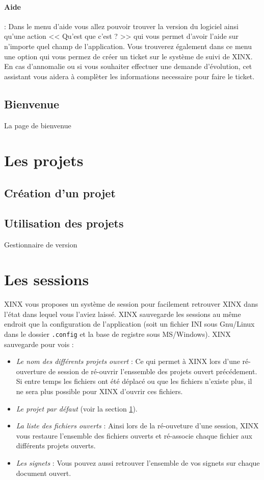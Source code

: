 \documentclass[a4paper,10pt,twoside]{book}
\begin{document}
\paragraph{Aide} : Dans le menu d'aide vous allez pouvoir trouver la version du logiciel ainsi qu'une action << Qu'est que c'est ? >> qui vous permet d'avoir l'aide sur n'importe quel champ de l'application. Vous trouverez également dans ce menu une option qui vous permez de créer un ticket sur le système de suivi de XINX. En cas d'annomalie ou si vous souhaiter effectuer une demande d'évolution, cet assistant vous aidera à complèter les informations necessaire pour faire le ticket.


\subsection{Bienvenue}
\label{sub:bienvenue}

La page de bienvenue

\section{Les projets}
\label{sec:Projets}

\subsection{Création d'un projet}

\subsection{Utilisation des projets}
\label{sec:RCS}
Gestionnaire de version

\section{Les sessions}
\label{sec:Sessions}

XINX vous proposes un système de session pour facilement retrouver XINX dans l'état dans lequel vous l'aviez laissé. XINX sauvegarde les sessions au même endroit que la configuration de l'application (soit un fichier INI sous Gnu/Linux dans le dossier \verb+.config+ et la base de registre sous MS/Windows). XINX sauvegarde pour vois :
\begin{itemize}
 \item \emph{Le nom des différents projets ouvert} : Ce qui permet à XINX lors d'une ré-ouverture de session de ré-ouvrir l'enssemble des projets ouvert précédement. Si entre temps les fichiers ont été déplacé ou que les fichiers n'existe plus, il ne sera plus possible pour XINX d'ouvrir ces fichiers.
 \item \emph{Le projet par défaut} (voir la section \ref{sec:Projets}).
 \item \emph{La liste des fichiers ouverts} : Ainsi lors de la ré-ouveture d'une session, XINX vous restaure l'ensemble des fichiers ouverts et ré-associe chaque fichier aux différents projets ouverts.
 \item \emph{Les signets} : Vous pouvez aussi retrouver l'ensemble de vos signets sur chaque document ouvert.
\end{itemize}
\end{document}
